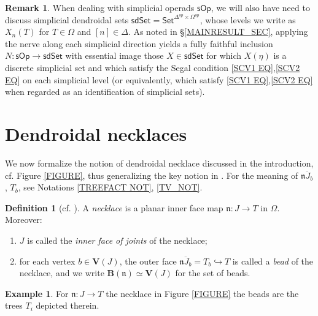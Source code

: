 \documentclass[a4paper,10pt
,draft
]{article}%
\numberwithin{equation}{section}
\numberwithin{figure}{section}
\theoremstyle{definition} %
\newtheorem{definition}[equation]{Definition}%
\newtheorem{example}[equation]{Example}%
\newtheorem{remark}[equation]{Remark}%
\newcommand{\sOp}{\ensuremath{\mathsf{sOp}}}%
\newcommand{\1}{\ensuremath{\mathbbm 1}}%
\begin{document}
\begin{remark}\label{SIMPOPREM}
	When dealing with simplicial operads $\sOp$,
	we will also have need to discuss
	simplicial dendroidal sets
	$\mathsf{sdSet} = \mathsf{Set}^{\Delta^{op} \times \Omega^{op}}$,
	whose levels we write as
	$X_n(T)$ for $T \in \Omega$ and $[n] \in \Delta$.
	As noted in \S \ref{MAINRESULT_SEC},
	applying the nerve along each simplicial direction
	yields a fully faithful inclusion
	$N \colon \sOp \to \mathsf{sdSet}$
	with essential image those $X \in \mathsf{sdSet}$
	for which $X(\eta)$ is a discrete simplicial set
	and which satisfy the Segal condition 
	\eqref{SCV1 EQ},\eqref{SCV2 EQ}
	on each simplicial level
	(or equivalently, which satisfy
	\eqref{SCV1 EQ},\eqref{SCV2 EQ}
	when regarded as an identification of simplicial sets).
\end{remark}




\section{Dendroidal necklaces}





We now formalize the notion of dendroidal necklace
discussed in the introduction,
cf. Figure \ref{FIGURE}, 
thus generalizing the key notion in \cite{DS11}.
For the meaning of 
$\overline{\mathfrak{n}J_b}$, $T_b$, see
Notations \ref{TREEFACT NOT}, \ref{TV_NOT}.


\begin{definition}[{cf. \cite[\S 3]{DS11}}]
        \label{NECKLACE_DEF}
	A \emph{necklace} is 
	a planar inner face map
	$\mathfrak{n} \colon J \to T$
	in $\Omega$.
	Moreover:
	\begin{enumerate}[label = (\roman*)]
		\item 
		$J$ is called the \emph{inner face of joints} of the necklace;
		\item for each vertex $b \in \boldsymbol{V}(J)$,
		the outer face
		$\overline{\mathfrak{n} J_b} = T_b \hookrightarrow T$
		is called a \emph{bead} of the necklace,
		and we write
		$\boldsymbol{B}(\mathfrak{n}) 
		\simeq 
		\boldsymbol{V}(J)$
		for the set of beads.
	\end{enumerate}
\end{definition}

\begin{example}
	For $\mathfrak{n} \colon J \to T$ the necklace 
	in Figure \ref{FIGURE} the beads 
	are the trees $T_i$ depicted therein.
\end{example}
\end{document}
